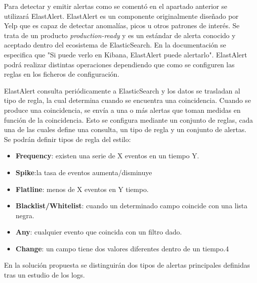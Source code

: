 Para detectar y emitir alertas como se comentó en el apartado anterior se utilizará ElastAlert.
ElastAlert es un componente originalmente diseñado por Yelp que es capaz de detectar anomalías, picos u otros patrones de interés. Se trata de un producto \textit{production-ready} y es un estándar de alerta conocido y aceptado dentro del ecosistema de ElasticSearch. En la documentación se especifica que "Si puede verlo en Kibana, ElastAlert puede alertarlo". ElastAlert podrá realizar distintas operaciones dependiendo que como se configuren las reglas en los ficheros de configuración. 

ElastAlert consulta periódicamente a ElasticSearch y los datos se trasladan al tipo de regla, la cual determina cuando se encuentra una coincidencia. Cuando se produce una coincidencia, se envía a una o más alertas que toman medidas en función de la coincidencia. Esto se configura mediante un conjunto de reglas, cada una de las cuales define una consulta, un tipo de regla y un conjunto de alertas. Se podrán definir tipos de regla del estilo:

\begin{itemize}
\item \textbf{Frequency}: existen una serie de X eventos en un tiempo Y.
\item \textbf{Spike}:la tasa de eventos aumenta/disminuye
\item \textbf{Flatline}: menos de X eventos en Y tiempo.
\item \textbf{Blacklist/Whitelist}: cuando un determinado campo coincide con una lista negra.
\item \textbf{Any}: cualquier evento que coincida con un filtro dado.
\item \textbf{Change}: un campo tiene dos valores diferentes dentro de un tiempo.4	

\end{itemize}

En la solución propuesta se distinguirán dos tipos de alertas principales definidas tras un estudio de los logs.

